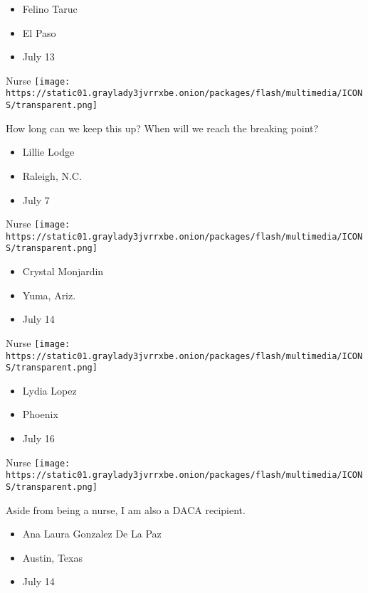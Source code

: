\begin{itemize}
\tightlist
\item
  Felino Taruc
\item
  El Paso
\item
  July 13
\end{itemize}

\protect\hyperlink{item-lillie-lodge}{}

Nurse
\texttt{[image: https://static01.graylady3jvrrxbe.onion/packages/flash/multimedia/ICONS/transparent.png]}

How long can we keep this up? When will we reach the breaking point?

\begin{itemize}
\tightlist
\item
  Lillie Lodge
\item
  Raleigh, N.C.
\item
  July 7
\end{itemize}

\protect\hyperlink{item-crystal-monjardin}{}

Nurse
\texttt{[image: https://static01.graylady3jvrrxbe.onion/packages/flash/multimedia/ICONS/transparent.png]}

\begin{itemize}
\tightlist
\item
  Crystal Monjardin
\item
  Yuma, Ariz.
\item
  July 14
\end{itemize}

\protect\hyperlink{item-lydia-lopez}{}

Nurse
\texttt{[image: https://static01.graylady3jvrrxbe.onion/packages/flash/multimedia/ICONS/transparent.png]}

\begin{itemize}
\tightlist
\item
  Lydia Lopez
\item
  Phoenix
\item
  July 16
\end{itemize}

\protect\hyperlink{item-ana-laura-gonzalez-de-la-paz}{}

Nurse
\texttt{[image: https://static01.graylady3jvrrxbe.onion/packages/flash/multimedia/ICONS/transparent.png]}

Aside from being a nurse, I am also a DACA recipient.

\begin{itemize}
\tightlist
\item
  Ana Laura Gonzalez De La Paz
\item
  Austin, Texas
\item
  July 14
\end{itemize}

